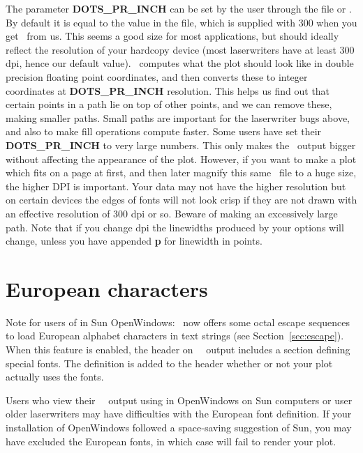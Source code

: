 The parameter {\bf DOTS\_PR\_INCH} can be set by the user through
the  file or .  By default
it is equal to the value in the 
file, which is supplied with 300 when you get \GMT\ from us.
This seems a good size for most applications, but should ideally
reflect the resolution of your hardcopy device (most laserwriters
have at least 300 dpi, hence our default value).  \GMT\ computes what the
plot should look like in double precision floating point
coordinates, and then converts these to integer coordinates at
{\bf DOTS\_PR\_INCH} resolution.  This helps us find out that certain
points in a path lie on top of other points, and we can remove
these, making smaller paths.  Small paths are important for the
laserwriter bugs above, and also to make fill operations compute
faster.  Some users have set their {\bf DOTS\_PR\_INCH} to very large
numbers.  This only makes the \PS\ output bigger
without affecting the appearance of the plot.  However, if you
want to make a plot which fits on a page at first, and then
later magnify this same \PS\ file to a huge size,
the higher DPI is important.  Your data may not have the higher
resolution but on certain devices the edges of fonts will not
look crisp if they are not drawn with an effective resolution
of 300 dpi or so.  Beware of making an excessively large path.
Note that if you change dpi the linewidths produced by your
 options will change, unless you have appended {\bf p}
for linewidth in points.

\section{European characters}
Note for users of  in Sun OpenWindows: \GMT\ now
offers some octal escape sequences to load European alphabet
characters in text strings (see Section~\ref{sec:escape}).  When
this feature is enabled, the header on \GMT\ \PS\ output includes
a section defining special fonts.  The definition is added to
the header whether or not your plot actually uses the fonts.

Users who view their \GMT\ \PS\ output using
 in OpenWindows on Sun computers or user older
laserwriters may have difficulties with the European font
definition.  If your installation of OpenWindows followed
a space-saving suggestion of Sun, you may have excluded the
European fonts, in which case  will fail
to render your plot.

